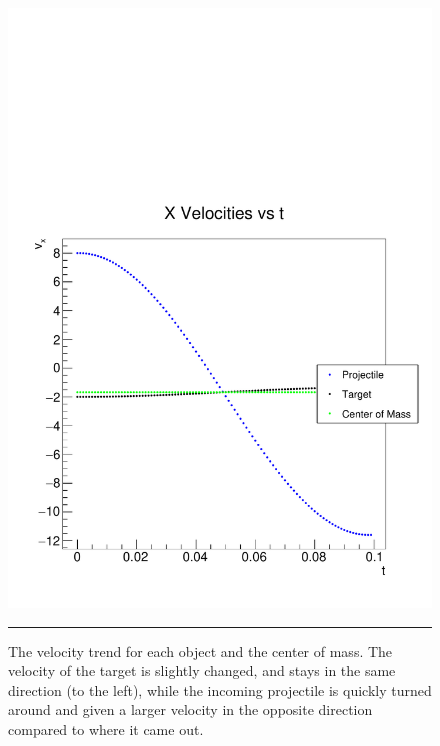 \documentclass[aps,prl,floatfix,preprint,nofootinbib]{revtex4}
\begin{document}
\begin{figure}[floatfix]
  \includegraphics[width=.45\textwidth]{plots/out_c7/vx_vs_t.pdf}
                  {\par\nobreak\rule[9pt]{35em}{0.5pt}\vspace{-5mm}}
                  \caption{The velocity trend for each object and the center of mass. The velocity of the target is slightly changed, and stays in the same direction (to the left), while the incoming projectile is quickly turned around and given a larger velocity in the opposite direction compared to where it came out.}
                  \label{fig:vx_c7}
\end{figure}
\end{document}
